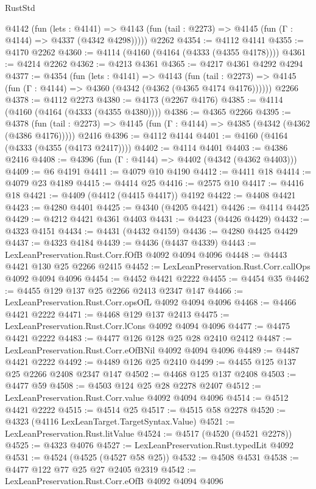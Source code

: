 \begin{lexlean}{RustStd}
\begin{coremodule}
{\begin{coremodule}
{{{{{{{{{{{{{{    @4142
      (fun (lets : @4141) =>
      @4143 (fun (tail : @2273) => @4145 (fun (Γ : @4144) => @4337 (@4342 @4298)))))
    @2262
@4354 := @4112 @4141
@4355 := @4170 @2262
@4360 := @4114 (@4160 (@4164 (@4333 (@4355 @4178))))
@4361 := @4214 @2262
@4362 := @4213 @4361
@4365 := @4217 @4361 @4292 @4294
@4377 := @4354
    (fun (lets : @4141) =>
    @4143
      (fun (tail : @2273) => @4145 (fun (Γ : @4144) => @4360 (@4342 (@4362 (@4365 @4174 @4176))))))
    @2266
@4378 := @4112 @2273
@4380 := @4173 (@2267 @4176)
@4385 := @4114 (@4160 (@4164 (@4333 (@4355 @4380))))
@4386 := @4365 @2266
@4395 := @4378
    (fun (tail : @2273) => @4145 (fun (Γ : @4144) => @4385 (@4342 (@4362 (@4386 @4176)))))
    @2416
@4396 := @4112 @4144
@4401 := @4160 (@4164 (@4333 (@4355 (@4173 @2417))))
@4402 := @4114 @4401
@4403 := @4386 @2416
@4408 := @4396 (fun (Γ : @4144) => @4402 (@4342 (@4362 @4403)))
@4409 := @6 @4191
@4411 := @4079 @10 @4190
@4412 := @4411 @18
@4414 := @4079 @23 @4189
@4415 := @4414 @25
@4416 := @2575 @10
@4417 := @4416 @18
@4421 := @4409 (@4412 (@4415 @4417)) @4192
@4422 := @4408 @4421
@4423 := @4280 @4401
@4425 := @4340 (@4205 @4421)
@4426 := @4114 @4425
@4429 := @4212 @4421 @4361 @4403
@4431 := @4423 (@4426 @4429)
@4432 := @4323 @4151
@4434 := @4431 (@4432 @4159)
@4436 := @4280 @4425 @4429
@4437 := @4323 @4184
@4439 := @4436 (@4437 @4339)
@4443 := LexLeanPreservation.Rust.Corr.fOfB @4092 @4094 @4096
@4448 := @4443 @4421 @130 @25 @2266 @2415
@4452 := LexLeanPreservation.Rust.Corr.callOps @4092 @4094 @4096
@4454 := @4452 @4421 @2222
@4455 := @4454 @35
@4462 := @4455 @129 @137 @25 @2266 @2413 @2347 @147
@4466 := LexLeanPreservation.Rust.Corr.opsOfL @4092 @4094 @4096
@4468 := @4466 @4421 @2222
@4471 := @4468 @129 @137 @2413
@4475 := LexLeanPreservation.Rust.Corr.lCons @4092 @4094 @4096
@4477 := @4475 @4421 @2222
@4483 := @4477 @126 @128 @25 @28 @2410 @2412
@4487 := LexLeanPreservation.Rust.Corr.eOfBNil @4092 @4094 @4096
@4489 := @4487 @4421 @2222
@4492 := @4489 @126 @25 @2410
@4499 := @4455 @125 @137 @25 @2266 @2408 @2347 @147
@4502 := @4468 @125 @137 @2408
@4503 := @4477 @59
@4508 := @4503 @124 @25 @28 @2278 @2407
@4512 := LexLeanPreservation.Rust.Corr.value @4092 @4094 @4096
@4514 := @4512 @4421 @2222
@4515 := @4514 @25
@4517 := @4515 @58 @2278
@4520 := @4323 (@4116 LexLeanTarget.TargetSyntax.Value)
@4521 := LexLeanPreservation.Rust.litValue
@4524 := @4517 (@4520 (@4521 @2278))
@4525 := @4323 @4076
@4527 := LexLeanPreservation.Rust.typedLit @4092
@4531 := @4524 (@4525 (@4527 @58 @25))
@4532 := @4508 @4531
@4538 := @4477 @122 @77 @25 @27 @2405 @2319
@4542 := LexLeanPreservation.Rust.Corr.eOfB @4092 @4094 @4096
}}}}}}}}}}}}}}
\end{coremodule}}
\end{coremodule}
\end{lexlean}
